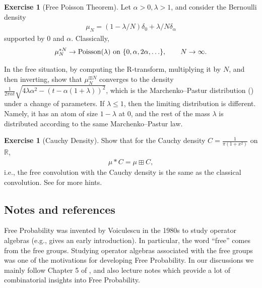 \documentclass[letterpaper,11pt,oneside,reqno]{amsart}
\numberwithin{equation}{section}
\newcounter{lecture}
\theoremstyle{definition}
\newtheorem{exercise}[proposition]{Exercise}
\begin{document}
\begin{exercise}[Free Poisson Theorem]
Let $\alpha>0, \lambda>1$, and consider the Bernoulli density
\begin{align*}
    \mu_N=(1-\lambda/N)\delta_0+\lambda/N\delta_\alpha
\end{align*}
supported by $0$ and $\alpha$.
Classically, 
\begin{equation*}
    \mu_N^{*N}\to \mathrm{Poisson}(\lambda)
    \textnormal{\ on $\{0,\alpha,2 \alpha,\ldots\}$}
    ,\qquad N\to\infty.
\end{equation*}

In the free situation, by computing the R-transform, multiplying it by $N$, 
and then inverting, show that $\mu_N^{\boxplus N}$ 
converges to the density $\frac{1}{2\pi\alpha t}\sqrt{4\lambda\alpha^2-(t-\alpha(1+\lambda))^2}$, 
which is the Marchenko--Pastur distribution ()
under a change of parameters. 
If $\lambda\le1$, then the limiting distribution is different. Namely, it has an atom of size $1- \lambda$ at $0$,
and the rest of the mass $\lambda$ is distributed according to the same Marchenko--Pastur law.
\end{exercise}

\begin{exercise}[{Cauchy Density}]
Show that for the Cauchy density $C=\frac{1}{\pi(1+x^2)}$ on $\mathbb{R}$, 
\begin{align*}
    \mu*C=\mu\boxplus C,
\end{align*}
i.e., the free convolution with the Cauchy density is the same as the classical convolution.
See \cite[Exercise 5.3.41]{AndersonGuionnetZeitouniBook} for more hints.
\end{exercise}


\subsection{Notes and references} %
\label{sub:notes_Free}

Free Probability was invented by Voiculescu in the 1980s
to study operator algebras
(e.g., \cite{Voiculescu_Free_book} gives an early introduction).
In particular, the word ``free'' comes from the free groups.
Studying operator algebras associated with the free groups 
was one of the motivations for developing Free Probability.
In our discussions we mainly follow Chapter 5 of \cite{AndersonGuionnetZeitouniBook},
and also lecture notes \cite{Novak2012FreeLectures} which provide a lot of combinatorial
insights into Free Probability.
\end{document}
